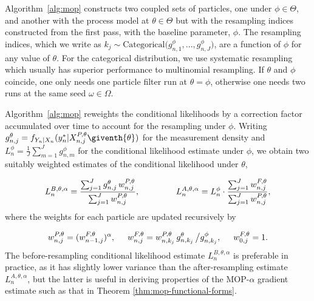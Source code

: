 \documentclass[11pt]{article}
\newcommand\arxiv[2]{#1} %
\begin{document}

Algorithm~\ref{alg:mop} constructs two coupled sets of particles, one under $\phi \in \Theta$, and another with the process model at $\theta \in \Theta$ but with the resampling indices constructed from the first pass, with the baseline parameter, $\phi$.
The resampling indices, which we write as $k_j \sim \text{Categorical}\big(g^{\phi}_{n,1},...,g^{\phi}_{n,J}\big)$, are a function of $\phi$ for any value of $\theta$.
For the categorical distribution, we use systematic resampling \cite{arulampalam02,king16} which usually has superior performance to multinomial resampling.
If $\theta$ and $\phi$ coincide, one only needs one particle filter run at $\theta=\phi$, otherwise one needs two runs at the same seed $\omega \in \Omega$.

Algorithm~\ref{alg:mop} reweights the conditional likelihoods by a correction factor accumulated over time to account for the resampling under $\phi$. 
Writing $g^{\theta}_{n,j}={f}_{{Y}_{n}|{X}_{n}}(y_{n}^{*}|{X}_{n,j}^{P,\theta}\giventh{\theta})$ for the measurement density and $L_n^{\phi} = \frac{1}{J}\sum_{m=1}^{J}g^{\phi}_{n,m}$ for the conditional likelihood estimate under $\phi$, we obtain two suitably weighted estimates of the conditional likelihood under $\theta$,
\arxiv{}{\vspace*{-1.5mm}}
\begin{equation}
     \label{eq:mop-conditional-likelihood}
     L_n^{B,\theta,\alpha} = \frac{\sum_{j=1}^Jg^\theta_{n,j}\, w^{P,\theta}_{n,j}}{\sum_{j=1}^J  w^{P,\theta}_{n,j}}, \hspace{15mm} 
     L_n^{A,\theta,\alpha} = L_n^\phi\cdot \frac{\sum_{j=1}^J w^{F,\theta}_{n,j}}{\sum_{j=1}^J  w^{P,\theta}_{n,j}},
     \arxiv{}{\vspace*{-1.5mm}}
\end{equation}
where the weights for each particle are updated recursively by
\arxiv{}{\vspace*{-1.5mm}}
\begin{equation}
    \label{eq:weighting-scheme}
    w_{n,j}^{P,\theta} = (w_{n-1,j}^{F,\theta})^\alpha, 
    \hspace{5mm}
    w^{F,\theta}_{n,j} = w^{P,\theta}_{n,k_j} \, g^{\theta}_{n,k_j} \, \big/ g^{\phi}_{n,k_j}, 
    \hspace{5mm}
    w^{F,\theta}_{0,j}= 1.
    \arxiv{}{\vspace*{-1.5mm}}
\end{equation}
The before-resampling conditional likelihood estimate $L_n^{B,\theta,\alpha}$ is preferable in practice, as it has slightly lower variance than the after-resampling estimate $L_n^{A,\theta,\alpha}$, but the latter is useful in deriving properties of the MOP-$\alpha$ gradient estimate such as that in Theorem \ref{thm:mop-functional-forms}.
\end{document}
